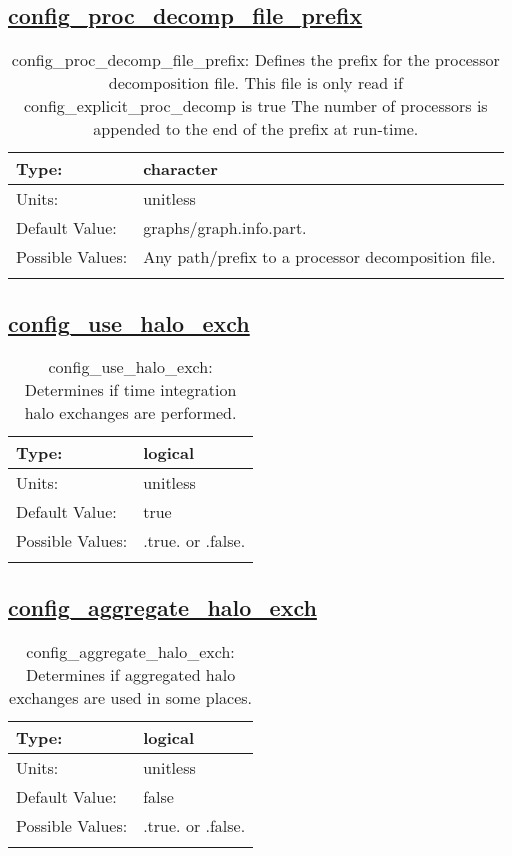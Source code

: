\subsection[config\_proc\_decomp\_file\_prefix]{\hyperref[sec:nm_tab_decomposition]{config\_proc\_decomp\_file\_prefix}}
\label{subsec:nm_sec_config_proc_decomp_file_prefix}
\begin{center}
\begin{longtable}{| p{2.0in} || p{4.0in} |}
    \hline
    Type: & character \\
    \hline
    Units: & \si{unitless} \\
    \hline
    Default Value: & graphs/graph.info.part. \\
    \hline
    Possible Values: & Any path/prefix to a processor decomposition file. \\
    \hline
    \caption{config\_proc\_decomp\_file\_prefix: Defines the prefix for the processor decomposition file. This file is only read if config\_explicit\_proc\_decomp is true The number of processors is appended to the end of the prefix at run-time.}
\end{longtable}
\end{center}
\subsection[config\_use\_halo\_exch]{\hyperref[sec:nm_tab_decomposition]{config\_use\_halo\_exch}}
\label{subsec:nm_sec_config_use_halo_exch}
\begin{center}
\begin{longtable}{| p{2.0in} || p{4.0in} |}
    \hline
    Type: & logical \\
    \hline
    Units: & \si{unitless} \\
    \hline
    Default Value: & true \\
    \hline
    Possible Values: & .true. or .false. \\
    \hline
    \caption{config\_use\_halo\_exch: Determines if time integration halo exchanges are performed.}
\end{longtable}
\end{center}
\subsection[config\_aggregate\_halo\_exch]{\hyperref[sec:nm_tab_decomposition]{config\_aggregate\_halo\_exch}}
\label{subsec:nm_sec_config_aggregate_halo_exch}
\begin{center}
\begin{longtable}{| p{2.0in} || p{4.0in} |}
    \hline
    Type: & logical \\
    \hline
    Units: & \si{unitless} \\
    \hline
    Default Value: & false \\
    \hline
    Possible Values: & .true. or .false. \\
    \hline
    \caption{config\_aggregate\_halo\_exch: Determines if aggregated halo exchanges are used in some places.}
\end{longtable}
\end{center}
